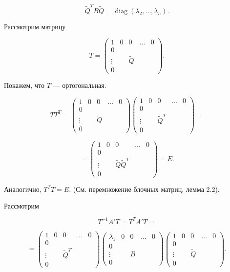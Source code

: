 {\[
\tilde{Q}^{T} B \tilde{Q} = \operatorname{diag}(\lambda_2, \dots, \lambda_n).
\]


Рассмотрим матрицу 



\[
T = \begin{pmatrix}
1 & 0 & 0 & \dots & 0 \\
0 & \\
\vdots & & \tilde{Q} \\
0 &
\end{pmatrix}.
\]



Покажем, что \( T \) — ортогональная.



\[
TT^T = \begin{pmatrix}
1 & 0 & 0 & \dots & 0 \\
0 & \\
\vdots & & \tilde{Q} \\
0 &
\end{pmatrix}
\begin{pmatrix}
1 & 0 & 0 & \dots & 0 \\
0 & \\
\vdots & & \tilde{Q}^T \\
0 &
\end{pmatrix} =
\]





\[
= \begin{pmatrix}
1 & 0 & 0 & \dots & 0 \\
0 & \\
\vdots & & \tilde{Q} \tilde{Q}^T \\
0 &
\end{pmatrix} = E.
\]



Аналогично, \( T^T T = E \). (См. перемножение блочных матриц, лемма 2.2).

Рассмотрим 



\[
T^{-1}A'T = T^T A' T =
\]





\[
= \begin{pmatrix}
1 & 0 & 0 & \dots & 0 \\
0 & \\
\vdots & & \tilde{Q}^T \\
0 &
\end{pmatrix}
\begin{pmatrix}
\lambda_1 & 0 & 0 & \dots & 0 \\
0 & \\
\vdots & & B \\
0 &
\end{pmatrix}
\begin{pmatrix}
1 & 0 & 0 & \dots & 0 \\
0 & \\
\vdots & & \tilde{Q} \\
0 &
\end{pmatrix}.
\]





}
